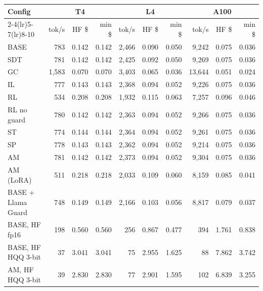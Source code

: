 \begin{tabular}{@{}l rrrrrrrrr@{}}
\toprule
Config & \multicolumn{3}{c}{T4} & \multicolumn{3}{c}{L4} & \multicolumn{3}{c}{A100} \\\cmidrule(lr){2-4}\cmidrule(lr){5-7}\cmidrule(lr){8-10}
 & tok/s & HF \$ & min \$ & tok/s & HF \$ & min \$ & tok/s & HF \$ & min \$ \\
\midrule
BASE & 783 & 0.142 & 0.142 & 2,466 & 0.090 & 0.050 & 9,242 & 0.075 & 0.036 \\
SDT & 781 & 0.142 & 0.142 & 2,425 & 0.092 & 0.050 & 9,269 & 0.075 & 0.036 \\
GC & 1,583 & 0.070 & 0.070 & 3,403 & 0.065 & 0.036 & 13,644 & 0.051 & 0.024 \\
IL & 777 & 0.143 & 0.143 & 2,368 & 0.094 & 0.052 & 9,226 & 0.075 & 0.036 \\
RL & 534 & 0.208 & 0.208 & 1,932 & 0.115 & 0.063 & 7,257 & 0.096 & 0.046 \\
RL no guard & 780 & 0.142 & 0.142 & 2,363 & 0.094 & 0.052 & 9,266 & 0.075 & 0.036 \\
ST & 774 & 0.144 & 0.144 & 2,364 & 0.094 & 0.052 & 9,261 & 0.075 & 0.036 \\
SP & 778 & 0.143 & 0.143 & 2,362 & 0.094 & 0.052 & 9,214 & 0.075 & 0.036 \\
AM & 781 & 0.142 & 0.142 & 2,373 & 0.094 & 0.052 & 9,304 & 0.075 & 0.036 \\
AM (LoRA) & 511 & 0.218 & 0.218 & 2,033 & 0.109 & 0.060 & 8,159 & 0.085 & 0.041 \\
BASE + Llama Guard & 748 & 0.149 & 0.149 & 2,166 & 0.103 & 0.056 & 8,817 & 0.079 & 0.037 \\
BASE, HF fp16 & 198 & 0.560 & 0.560 & 256 & 0.867 & 0.477 & 394 & 1.761 & 0.838 \\
BASE, HF HQQ 3-bit & 37 & 3.041 & 3.041 & 75 & 2.955 & 1.625 & 88 & 7.862 & 3.742 \\
AM, HF HQQ 3-bit & 39 & 2.830 & 2.830 & 77 & 2.901 & 1.595 & 102 & 6.839 & 3.255 \\
\bottomrule
\end{tabular}
